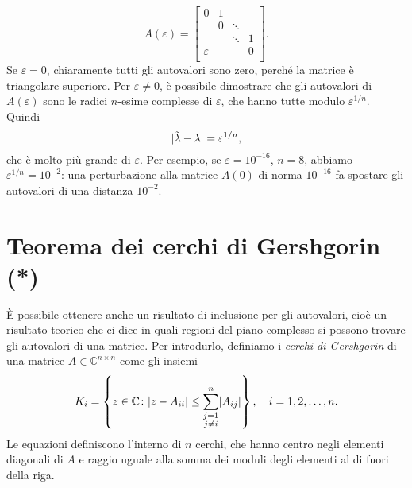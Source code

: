 \documentclass[a4paper]{report}
\DeclarePairedDelimiter{\abs}{\lvert}{\rvert}
\theoremstyle{definiton}
\theoremstyle{remark}
\begin{document}
\[
A(\varepsilon) = \begin{bmatrix}
    0 & 1\\
    & 0 & \ddots\\
    & & \ddots & 1\\
    \varepsilon & & &  0\\
\end{bmatrix}.
\]
Se $\varepsilon=0$, chiaramente tutti gli autovalori sono zero, perché la matrice è triangolare superiore. Per $\varepsilon \neq 0$, è possibile dimostrare che gli autovalori di $A(\varepsilon)$ sono le radici $n$-esime complesse di $\varepsilon$, che hanno tutte modulo $\varepsilon^{1/n}$. Quindi
\[
\abs{\tilde{\lambda} - \lambda} = \varepsilon^{1/n},
\]
che è molto più grande di $\varepsilon$. Per esempio, se $\varepsilon=10^{-16}$, $n=8$, abbiamo $\varepsilon^{1/n} = 10^{-2}$: una perturbazione alla matrice $A(0)$ di norma $10^{-16}$ fa spostare gli autovalori di una distanza $10^{-2}$.

\section{Teorema dei cerchi di Gershgorin (*)}

È possibile ottenere anche un risultato di inclusione per gli autovalori, cioè un risultato teorico che ci dice in quali regioni del piano complesso si possono trovare gli autovalori di una matrice. Per introdurlo, definiamo i \emph{cerchi di Gershgorin} di una matrice $A\in\mathbb{C}^{n\times n}$ come gli insiemi
\[
K_i = \left\{z\in \mathbb{C} \colon \abs{z - A_{ii}} \leq \sum_{\substack{j=1\\ j \neq i}}^n \abs{A_{ij}} \right\}, \quad i=1,2,\dots,n.
\]
Le equazioni definiscono l'interno di $n$ cerchi, che hanno centro negli elementi diagonali di $A$ e raggio uguale alla somma dei moduli degli elementi al di fuori della riga.
\end{document}
